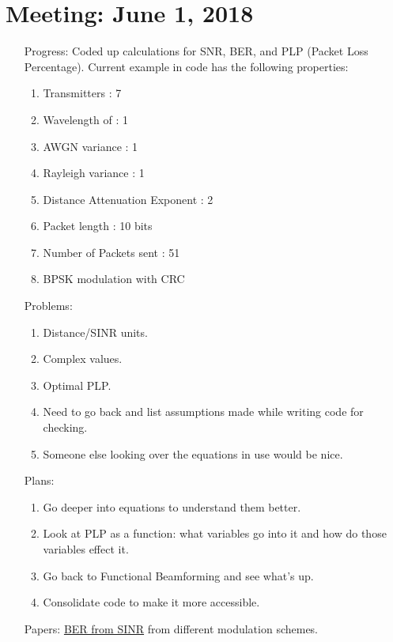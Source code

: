 \documentclass[11pt]{article}
\begin{document}
\section{Meeting: June 1, 2018}
\begin{itemize}
\item[Progress:]
Coded up calculations for SNR, BER, and PLP (Packet Loss Percentage).  Current example in code has the following properties:
\begin{enumerate}
\item Transmitters                               : 7
\item Wavelength of                            : 1
\item AWGN variance                         : 1
\item Rayleigh variance                      : 1
\item Distance Attenuation Exponent : 2
\item Packet length                             : 10 bits
\item Number of Packets sent            : 51
\item BPSK modulation with CRC
\end{enumerate}

\item[Problems:]
\begin{enumerate}
\item Distance/SINR units.
\item Complex values.
\item Optimal PLP.
\item Need to go back and list assumptions made while writing code for checking.
\item Someone else looking over the equations in use would be nice.
\end{enumerate}

\item[Plans:]
\begin{enumerate}
\item Go deeper into equations to understand them better.
\item Look at PLP as a function: what variables go into it and how do those variables effect it.
\item Go back to Functional Beamforming and see what's up.
\item Consolidate code to make it more accessible.
\end{enumerate}

\item[Papers:]
\href{https://www.unilim.fr/pages_perso/vahid/notes/ber_awgn.pdf}{BER from SINR} from different modulation schemes.

\end{itemize}\newpage
\end{document}
